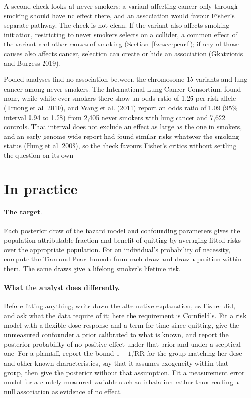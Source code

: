 A second check looks at never smokers: a variant affecting cancer only through smoking should have no effect there, and an association would favour Fisher's separate pathway. The check is not clean. If the variant also affects smoking initiation, restricting to never smokers selects on a collider, a common effect of the variant and other causes of smoking (Section~\ref{fw:sec:pearl}); if any of those causes also affects cancer, selection can create or hide an association (Gkatzionis and Burgess 2019).

Pooled analyses find no association between the chromosome 15 variants and lung cancer among never smokers. The International Lung Cancer Consortium found none, while white ever smokers there show an odds ratio of 1.26 per risk allele (Truong et al. 2010), and Wang et al. (2011) report an odds ratio of 1.09 (95\% interval 0.94 to 1.28) from 2,405 never smokers with lung cancer and 7,622 controls. That interval does not exclude an effect as large as the one in smokers, and an early genome wide report had found similar risks whatever the smoking status (Hung et al. 2008), so the check favours Fisher's critics without settling the question on its own.

\section{In practice}

\paragraph{The target.} Each posterior draw of the hazard model and confounding parameters gives the population attributable fraction and benefit of quitting by averaging fitted risks over the appropriate population. For an individual's probability of necessity, compute the Tian and Pearl bounds from each draw and draw a position within them. The same draws give a lifelong smoker's lifetime risk.

\paragraph{What the analyst does differently.} Before fitting anything, write down the alternative explanation, as Fisher did, and ask what the data require of it; here the requirement is Cornfield's. Fit a risk model with a flexible dose response and a term for time since quitting, give the unmeasured confounder a prior calibrated to what is known, and report the posterior probability of no positive effect under that prior and under a sceptical one. For a plaintiff, report the bound $1 - 1/\mathrm{RR}$ for the group matching her dose and other known characteristics, say that it assumes exogeneity within that group, then give the posterior without that assumption. Fit a measurement error model for a crudely measured variable such as inhalation rather than reading a null association as evidence of no effect.


